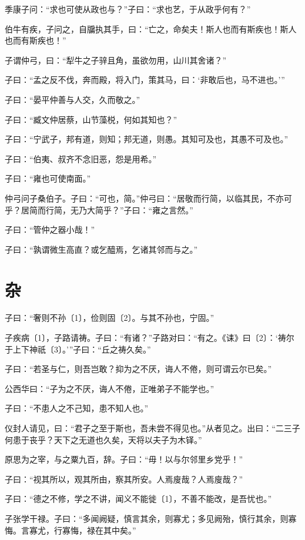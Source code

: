 \documentclass[a5paper]{ctexbook}
\begin{document}
    季康子问：“求也可使从政也与？”子曰：“求也艺，于从政乎何有？”

    伯牛有疾，子问之，自牖执其手，曰：“亡之，命矣夫！斯人也而有斯疾也！斯人也而有斯疾也！”

    子谓仲弓，曰：“犁牛之子骍且角，虽欲勿用，山川其舍诸？”

    子曰：“孟之反不伐，奔而殿，将入门，策其马，曰：‘非敢后也，马不进也。’”

    子曰：“晏平仲善与人交，久而敬之。”

    子曰：“臧文仲居蔡，山节藻棁，何如其知也？”

    子曰：“宁武子，邦有道，则知；邦无道，则愚。其知可及也，其愚不可及也。”

    子曰：“伯夷、叔齐不念旧恶，怨是用希。”

    子曰：“雍也可使南面。”

    仲弓问子桑伯子。子曰：“可也，简。”仲弓曰：“居敬而行简，以临其民，不亦可乎？居简而行简，无乃大简乎？”子曰：“雍之言然。”

    子曰：“管仲之器小哉！”

    子曰：“孰谓微生高直？或乞醯焉，乞诸其邻而与之。”

    \chapter{杂}

    子曰：“奢则不孙〔1〕，俭则固〔2〕。与其不孙也，宁固。”

    子疾病〔1〕，子路请祷。子曰：“有诸？”子路对曰：“有之。《诔》曰〔2〕：‘祷尔于上下神祇〔3〕。’”子曰：“丘之祷久矣。”

    子曰：“若圣与仁，则吾岂敢？抑为之不厌，诲人不倦，则可谓云尔已矣。”
    
    公西华曰：“子为之不厌，诲人不倦，正唯弟子不能学也。”

    子曰：“不患人之不己知，患不知人也。”

    仪封人请见，曰：“君子之至于斯也，吾未尝不得见也。”从者见之。出曰：“二三子何患于丧乎？天下之无道也久矣，天将以夫子为木铎。”

    原思为之宰，与之粟九百，辞。子曰：“毋！以与尔邻里乡党乎！”

    子曰：“视其所以，观其所由，察其所安。人焉廋哉？人焉廋哉？”

    

    子曰：“德之不修，学之不讲，闻义不能徙〔1〕，不善不能改，是吾忧也。”

    子张学干禄。子曰：“多闻阙疑，慎言其余，则寡尤；多见阙殆，慎行其余，则寡悔。言寡尤，行寡悔，禄在其中矣。”
\end{document}
